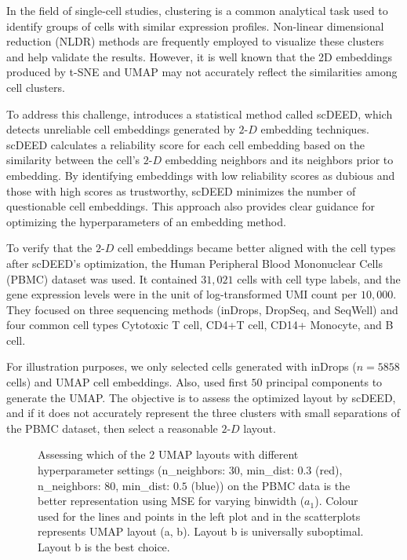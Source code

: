 \documentclass[
  12pt]{article}
\newcommand\gD{$2\text{-}D$}
\begin{document}
In the field of single-cell studies, clustering is a common analytical
task used to identify groups of cells with similar expression profiles.
Non-linear dimensional reduction (NLDR) methods are frequently employed
to visualize these clusters and help validate the results. However, it
is well known that the 2D embeddings produced by t-SNE and UMAP may not
accurately reflect the similarities among cell clusters.

To address this challenge, \citet{xia2023} introduces a statistical
method called scDEED, which detects unreliable cell embeddings generated
by \gD{} embedding techniques. scDEED calculates a reliability score for
each cell embedding based on the similarity between the cell's \gD{}
embedding neighbors and its neighbors prior to embedding. By identifying
embeddings with low reliability scores as dubious and those with high
scores as trustworthy, scDEED minimizes the number of questionable cell
embeddings. This approach also provides clear guidance for optimizing
the hyperparameters of an embedding method.

To verify that the \gD{} cell embeddings became better aligned with the
cell types after scDEED's optimization, the Human Peripheral Blood
Mononuclear Cells (PBMC) dataset was used. It contained \(31,021\) cells
with cell type labels, and the gene expression levels were in the unit
of log-transformed UMI count per \(10,000\). They focused on three
sequencing methods (inDrops, DropSeq, and SeqWell) and four common cell
types Cytotoxic T cell, CD4+T cell, CD14+ Monocyte, and B cell.

For illustration purposes, we only selected cells generated with inDrops
(\(n=5858\) cells) and UMAP cell embeddings. Also, \citet{xia2023} used
first \(50\) principal components to generate the UMAP. The objective is
to assess the optimized layout by scDEED, and if it does not accurately
represent the three clusters with small separations of the PBMC dataset,
then select a reasonable \gD{} layout.

\begin{figure}[H]


\caption{\label{fig-pbmc-mse-umap}Assessing which of the 2 UMAP layouts
with different hyperparameter settings (n\_neighbors: \(30\), min\_dist:
\(0.3\) (red), n\_neighbors: \(80\), min\_dist: \(0.5\) (blue)) on the
PBMC data is the better representation using MSE for varying binwidth
(\(a_1\)). Colour used for the lines and points in the left plot and in
the scatterplots represents UMAP layout (a, b). Layout b is universally
suboptimal. Layout b is the best choice.}

\end{figure}%
\end{document}
